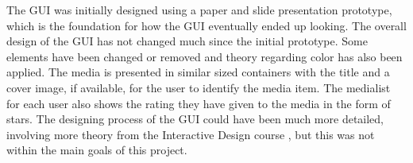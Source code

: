 The GUI was initially designed using a paper and slide presentation prototype, which is the foundation for how the GUI eventually ended up looking. The overall design of the GUI has not changed much since the initial prototype. Some elements have been changed or  removed and theory regarding color has also been applied. The media is presented in similar sized containers with the title and a cover image, if available, for the user to identify the media item. The medialist for each user also shows the rating they have given to the media in the form of stars. The designing process of the GUI could have been much more detailed, involving more theory from the Interactive Design course \cite{DEBBook}, but this was not within the main goals of this project.